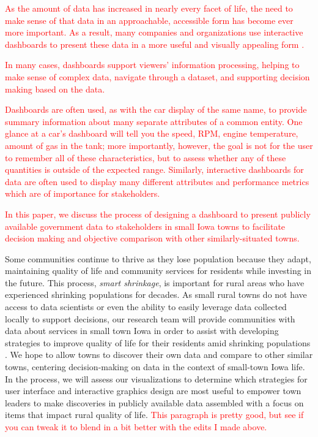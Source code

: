 \documentclass[letterpaper,inpress]{jdsart}
\begin{document}
{\textcolor{red}{As the amount of data has increased in nearly every facet of life, the need to make sense of that data in an approachable, accessible form has become ever more important. 
As a result, many companies and organizations use interactive dashboards to present these data in a more useful and visually appealing form \citep{fisher}.}}

{\textcolor{red}{In many cases, dashboards support viewers' information processing, helping to make sense of complex data, navigate through a dataset, and supporting decision making based on the data.}}

{\textcolor{red}{Dashboards are often used, as with the car display of the same name, to provide summary information about many separate attributes of a common entity. One glance at a car's dashboard will tell you the speed, RPM, engine temperature, amount of gas in the tank; more importantly, however, the goal is not for the user to remember all of these characteristics, but to assess whether any of these quantities is outside of the expected range. 
Similarly, interactive dashboards for data are often used to display many different attributes and performance metrics which are of importance for stakeholders.}}

{\textcolor{red}{In this paper, we discuss the process of designing a dashboard to present publicly available government data to stakeholders in small Iowa towns to facilitate decision making and objective comparison with other similarly-situated towns.}}

Some communities continue to thrive as they lose population because they adapt, maintaining quality of life and community services for residents while investing in the future.
This process, \emph{smart shrinkage}, is important for rural areas who have experienced shrinking populations for decades.
As small rural towns do not have access to data scientists or even the ability to easily leverage data collected locally to support decisions, our research team will provide communities with data about services in small town Iowa in order to assist with developing strategies to improve quality of life for their residents amid shrinking populations \citep{scc}.
We hope to allow towns to discover their own data and compare to other similar towns, centering decision-making on data in the context of small-town Iowa life.
In the process, we will assess our visualizations to determine which strategies for user interface and interactive graphics design are most useful to empower town leaders to make discoveries in publicly available data assembled with a focus on items that impact rural quality of life.
{\textcolor{red}{This paragraph is pretty good, but see if you can tweak it to blend in a bit better with the edits I made above.}}
\end{document}
